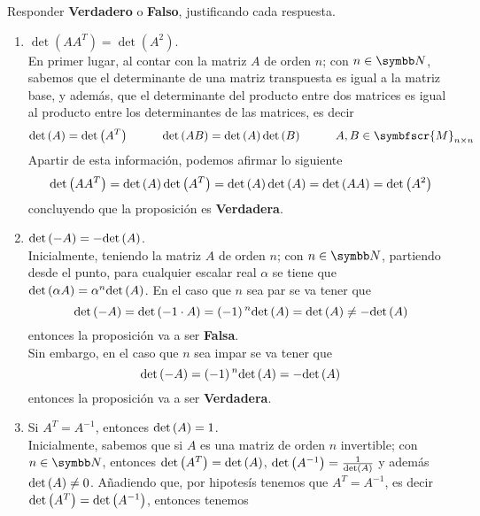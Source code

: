 \item Responder \textbf{Verdadero} o \textbf{Falso}, justificando cada respuesta.
    \begin{enumerate}[label=\listAlph]
        \item \(\det\left(AA^T\right) = \det\left(A^2\right)\). \\
            En primer lugar, al contar con la matriz \(A\) de orden \(n\); con \(n \in \realN\),
            sabemos que el determinante de una matriz transpuesta es igual a la matriz base, y además,
            que el determinante del producto entre dos matrices es igual al producto entre los determinantes de las matrices, es decir 
            \[
                \pdet{A} = \pdet{A^T}
                \hspace{1cm}
                \pdet{AB} = \pdet{A}\pdet{B} \hspace{1cm} A,B \in \symbfscr{M}_{n \times n}
            \]
            Apartir de esta información, podemos afirmar lo siguiente
            \[
                \text{det} \left( AA^{T} \right) = \text{det} \left( A \right)\text{det} \left( A^T \right) = \text{det} \left( A \right)\text{det} \left( A \right) = \text{det} \left( AA \right) = \text{det} \left( A^2 \right)
            \]
            concluyendo que la proposición es \textbf{Verdadera}.
        \item \(\text{det} \left( -A \right) = -\text{det} \left( A \right)\). \\
            Inicialmente, teniendo la matriz \(A\) de orden \(n\); con \(n \in \realN\),
            partiendo desde el punto, para cualquier escalar real \(\alpha\) se tiene que \(\text{det} \left( \alpha A \right) = \alpha^n \text{det} \left( A \right)\).
            En el caso que \(n\) sea par se va tener que
            \[
                \text{det} \left( -A \right) = \text{det} \left( -1 \cdot A \right) = \left(-1\right){}^{n} \text{det} \left( A \right) = \text{det} \left( A \right) \neq -\text{det} \left( A \right)
            \]
            entonces la proposición va a ser \textbf{Falsa}.
            \\[0.25cm]
            Sin embargo, en el caso que \(n\) sea impar se va tener que
            \[
                \text{det} \left( -A \right) = \left(-1\right){}^{n} \text{det} \left( A \right) = -\text{det} \left( A \right)
            \]
            entonces la proposición va a ser \textbf{Verdadera}.
        \item Si \(A^T = A^{-1}\), entonces \(\text{det} \left( A \right) = 1\). \\
            Inicialmente, sabemos que si \(A\) es una matriz de orden \(n\) invertible; con \(n \in \realN\), 
            entonces \(\text{det} \left( A^T \right) = \text{det} \left( A \right)\), \(\text{det} \left( A^{-1} \right) = \frac{1}{\text{det} \left( A \right)}\) y además \(\text{det} \left( A \right) \neq 0\). 
            Añadiendo que, por hipotesís tenemos que \(A^T = A^{-1}\), es decir \(\text{det} \left( A^T \right) = \text{det} \left( A^{-1} \right)\), entonces tenemos

\end{enumerate}
